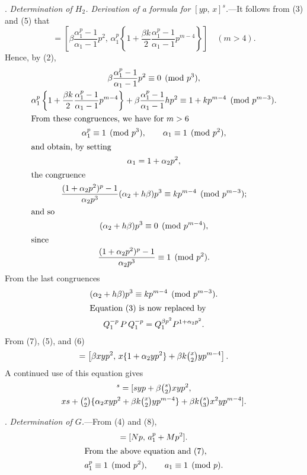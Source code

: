 \documentclass[oneside]{article}
\begin{document}
. \textit{Determination of $H_2$. Derivation of a formula for
$[yp,\, x]^s$.}---It follows from (3) and (5) that
\begin{equation*}
[-p^2,\, 1,\, p^2] = \left[\beta\frac{\alpha_1^p-1}{\alpha_1-1}p^2,\,
  \alpha_1^p\left \{ 1+\frac{\beta k}{2}
  \frac{\alpha_1^p-1}{\alpha_1-1} p^{m-4}\right \} \right] \quad (m > 4).
\end{equation*}
\noindent Hence, by (2),
\begin{gather*}
\beta\frac{\alpha_1^p - 1}{\alpha_1 - 1}p^2 \equiv 0 \pmod{p^3}, \\
\alpha{}_1^p \left \{ 1 + \frac{\beta k}{2}
  \frac{\alpha{}_1^p-1}{\alpha_1 - 1} p^{m-4} \right \} +
  \beta\frac{\alpha{}_1^p - 1}{\alpha_1 - 1}hp^2
  \equiv 1 + kp^{m-4} \pmod{p^{m-3}}. \\
\intertext{From these congruences, we have for $m > 6$}
\alpha{}_1^p \equiv 1 \pmod{p^3}, \qquad \alpha_1 \equiv 1 \pmod{p^2}, \\
\intertext{and obtain, by setting}
\alpha_1 = 1 + \alpha_2 p^2, \\
\intertext{the congruence}
\frac{(1 + \alpha_2 p^2)^p - 1}{\alpha_2 p^3}(\alpha_2 + h\beta)p^3
  \equiv kp^{m-4} \pmod{p^{m-3}}; \\
\intertext{and so}
(\alpha_2 + h\beta)p^3 \equiv 0 \pmod{p^{m-4}}, \\
\intertext{since}
\frac{(1+\alpha_2 p^2)^p-1}{\alpha_2 p^3} \equiv 1 \pmod{p^2}.
\end{gather*}
\noindent From the last congruences
\begin{gather}
(\alpha_2 + h\beta)p^3 \equiv kp^{m-4} \pmod{p^{m-3}}. \\ %
\intertext{Equation (3) is now replaced by}
Q{}_1^{-p}\,P\, Q{}_1^{-p} = Q{}_1^{\beta p^2} P^{1 + \alpha_2 p^2}. %
\end{gather}
\noindent From (7), (5), and (6)
\begin{equation*}
[-yp,\, x,\, yp] = \left[\beta xyp^2,\, x\{1 + \alpha_2 yp^2\}
  + \beta k \tbinom{x}{2}yp^{m-4}\right].
\end{equation*}
\noindent A continued use of this equation gives
\begin{multline}
[yp,\, x]^s = [syp + \beta \tbinom{s}{2}xyp^2, \\
  xs + \tbinom{s}{2} \{\alpha_2 xyp^2 + \beta k\tbinom{x}{2}yp^{m-4}\} +
  \beta k\tbinom{s}{3}x^2yp^{m-4}]. %
\end{multline}

. \textit{Determination of $G$.}---From (4) and (8),
\begin{gather*}
[-p,\, 1,\, p] = [Np,\, a{}_1^p + Mp^2]. \\
\intertext{From the above equation and (7),}
a{}_1^p \equiv 1 \pmod{p^2}, \qquad a_1 \equiv 1 \pmod{p}.
\end{gather*}
\end{document}
